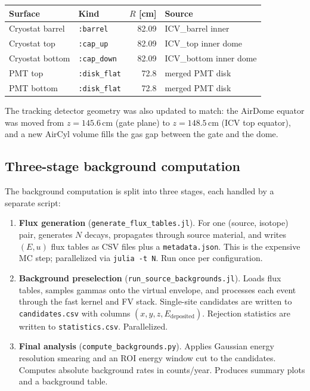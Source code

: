 \documentclass[11pt]{article}
\begin{document}
\begin{center}
\begin{tabular}{llrl}
\toprule
Surface & Kind & $R$ [cm] & Source \\
\midrule
Cryostat barrel & \texttt{:barrel} & 82.09 & ICV\_barrel inner \\
Cryostat top & \texttt{:cap\_up} & 82.09 & ICV\_top inner dome \\
Cryostat bottom & \texttt{:cap\_down} & 82.09 & ICV\_bottom inner dome \\
PMT top & \texttt{:disk\_flat} & 72.8 & merged PMT disk \\
PMT bottom & \texttt{:disk\_flat} & 72.8 & merged PMT disk \\
\bottomrule
\end{tabular}
\end{center}

The tracking detector geometry was also updated to match: the AirDome equator
was moved from $z = 145.6$\,cm (gate plane) to $z = 148.5$\,cm (ICV top
equator), and a new AirCyl volume fills the gas gap between the gate and the
dome.

\subsection{Three-stage background computation}

The background computation is split into three stages, each handled by a
separate script:

\begin{enumerate}[label=\arabic*.]
\item \textbf{Flux generation} (\texttt{generate\_flux\_tables.jl}). For one
(source, isotope) pair, generates $N$ decays, propagates through source
material, and writes $(E, u)$ flux tables as CSV files plus a
\texttt{metadata.json}. This is the expensive MC step; parallelized via
\texttt{julia -t N}. Run once per configuration.

\item \textbf{Background preselection} (\texttt{run\_source\_backgrounds.jl}).
Loads flux tables, samples gammas onto the virtual envelope, and processes each
event through the fast kernel and FV stack. Single-site candidates are written
to \texttt{candidates.csv} with columns $(x, y, z, E_{\text{deposited}})$.
Rejection statistics are written to \texttt{statistics.csv}. Parallelized.

\item \textbf{Final analysis} (\texttt{compute\_backgrounds.py}). Applies
Gaussian energy resolution smearing and an ROI energy window cut to the
candidates. Computes absolute background rates in counts/year. Produces summary
plots and a background table.
\end{enumerate}
\end{document}
